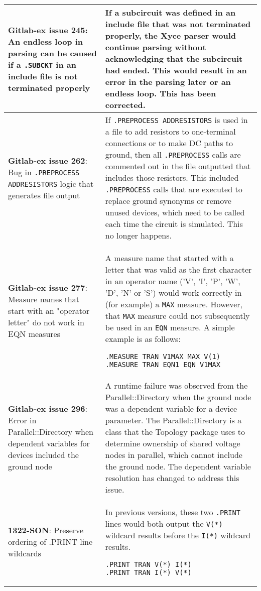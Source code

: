 {\begin{longtable}[h] {>{\raggedright\small}m{2in}|>{\raggedright\let\\\tabularnewline\small}m{3.5in}}
  \textbf{Gitlab-ex issue 245}: An endless loop in parsing can be caused 
if a \texttt{.SUBCKT} in an include file is not terminated properly &
If a subcircuit was defined in an include file that was not terminated
properly, the Xyce parser would continue parsing without acknowledging
that the subcircuit had ended.  This would result in an error in the
parsing later or an endless loop.  This has been corrected. \\ \hline
 
  \textbf{Gitlab-ex issue 262}: Bug in \texttt{.PREPROCESS ADDRESISTORS} 
logic that generates file output & If \texttt{.PREPROCESS ADDRESISTORS}
is used in a file to add resistors to one-terminal connections or to
make DC paths to ground, then all \texttt{.PREPROCESS} calls are 
commented out in the file outputted that includes those resistors.
This included \texttt{.PREPROCESS} calls that are executed to replace
ground synonyms or remove unused devices, which need to be called each
time the circuit is simulated.  This no longer happens. \\ \hline

  \textbf{Gitlab-ex issue 277}: Measure names that start with an "operator
letter" do not work in EQN measures & A measure name that started with a
letter that was valid as the first character in an operator name ('V', 'I',
'P', 'W', 'D', 'N' or 'S') would work correctly in (for example) a
\texttt{MAX} measure.  However, that \texttt{MAX} measure could not
subsequently be used in an \texttt{EQN} measure.  A simple example is
as follows:
\begin{verbatim}
.MEASURE TRAN V1MAX MAX V(1)
.MEASURE TRAN EQN1 EQN V1MAX
\end{verbatim}
\\ \hline

  \textbf{Gitlab-ex issue 296}: Error in Parallel::Directory when dependent 
variables for devices included the ground node &  A runtime failure was observed
from the Parallel::Directory when the ground node was a dependent variable
for a device parameter.  The Parallel::Directory is a class that the Topology package 
uses to determine ownership of shared voltage nodes in parallel, which cannot 
include the ground node.  The dependent variable
resolution has changed to address this issue. \\ \hline

  \textbf{1322-SON}: Preserve ordering of .PRINT line wildcards &
In previous \Xyce{} versions, these two \texttt{.PRINT} lines would
both output the \texttt{V(*)} wildcard results before the \texttt{I(*)}
wildcard results.
\begin{verbatim}
.PRINT TRAN V(*) I(*)
.PRINT TRAN I(*) V(*)
\end{verbatim}
\\ \hline


\end{longtable}}
